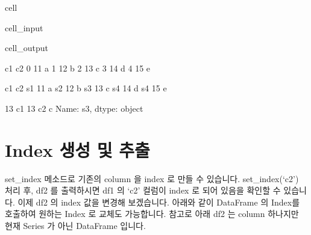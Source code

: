 \documentclass[letterpaper,10pt,english]{jupyterBook}
\begin{document}
\begin{sphinxuseclass}{cell}
\begin{sphinxVerbatimInput}
\begin{sphinxuseclass}{cell_input}
\end{sphinxuseclass}\end{sphinxVerbatimInput}
\begin{sphinxVerbatimOutput}

\begin{sphinxuseclass}{cell_output}
\begin{sphinxVerbatim}[commandchars=\\\{\}]
   c1 c2
0  11  a
1  12  b
2  13  c
3  14  d
4  15  e


    c1 c2
s1  11  a
s2  12  b
s3  13  c
s4  14  d
s4  15  e


13
c1    13
c2     c
Name: s3, dtype: object
\end{sphinxVerbatim}

\end{sphinxuseclass}\end{sphinxVerbatimOutput}

\end{sphinxuseclass}

\part{Index 생성 및 추출}
\label{\detokenize{chapter2/2.1.2_Python_Basics:id2}}
\sphinxAtStartPar
set\_index 메소드로 기존의 column 을 index 로 만들 수 있습니다. set\_index(‘c2’) 처리 후, df2 를 출력하시면 df1 의 ‘c2’ 컬럼이 index 로 되어 있음을 확인할 수 있습니다.
이제 df2 의 index 값을 변경해 보겠습니다. 아래와 같이 DataFrame 의 Index를 호출하여 원하는 Index 로 교체도 가능합니다. 참고로 아래 df2 는 column 하나지만 현재 Series 가 아닌 DataFrame 입니다.
\end{document}

